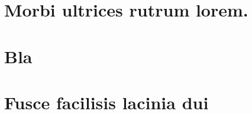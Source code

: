 \documentclass[
	12pt,				%
	openright,			%
	twoside,			%
	a4paper,			%
	english,			%
	brazil,				%
	]{abntex2}
\begin{document}

\begin{anexosenv}

\partanexos

\chapter{Morbi ultrices rutrum lorem.}
\lipsum[30]

\chapter{Bla}

\lipsum[31]

\chapter{Fusce facilisis lacinia dui}

\lipsum[32]

\end{anexosenv}


\printindex
\end{document}
